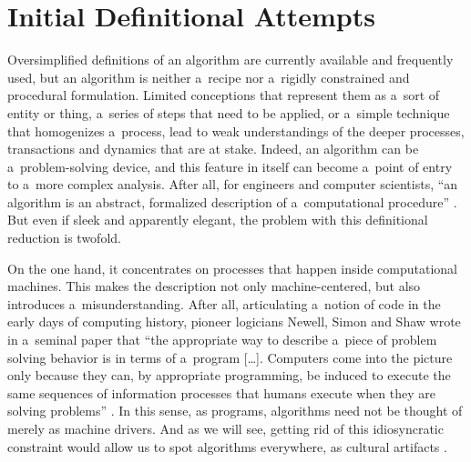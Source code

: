\section*{Initial Definitional Attempts}
Oversimplified definitions of an algorithm are currently available and frequently used, but an algorithm is neither a~recipe nor a~rigidly constrained and procedural formulation. Limited conceptions that represent them as a~sort of entity or thing, a~series of steps that need to be applied, or a~simple technique that homogenizes a~process, lead to weak understandings of the deeper processes, transactions and dynamics that are at stake. Indeed, an algorithm can be a~problem-solving device, and this feature in itself can become a~point of entry to a~more complex analysis. After all, for engineers and computer scientists, ``an algorithm is an abstract, formalized description of a~computational procedure''
\parencite[][p.3]{dourish_algorithms_2016}. %
 But even if sleek and apparently elegant, the problem with this definitional reduction is twofold.

On the one hand, it concentrates on processes that happen inside computational machines. This makes the description not only machine-centered, but also introduces a~misunderstanding. After all, articulating a~notion of code in the early days of computing history, pioneer logicians Newell, Simon and Shaw wrote in a~seminal paper that ``the appropriate way to describe a~piece of problem solving behavior is in terms of a~program […]. Computers come into the picture only because they can, by appropriate programming, be induced to execute the same sequences of information processes that humans execute when they are solving problems''
\parencite[][p.151]{newell_elements_1958}. %
 In this sense, as programs, algorithms need not be thought of merely as machine drivers. And as we will see, getting rid of this idiosyncratic constraint would allow us to spot algorithms everywhere, as cultural artifacts 
\parencites[][p.15]{finn_what_2017}[][]{seaver_algorithms_2017}.%


